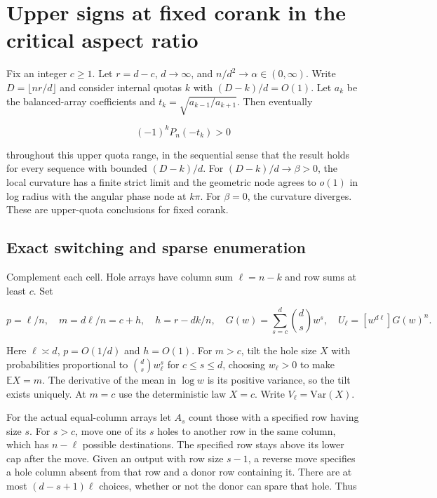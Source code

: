 \section{Upper signs at fixed corank in the critical aspect ratio}\label{sec:fixed-corank-critical-upper}

Fix an integer $c\ge1$. Let $r=d-c$, $d\to\infty$, and $n/d^2\to\alpha\in(0,\infty)$. Write $D=\lfloor nr/d\rfloor$ and consider internal quotas $k$ with $(D-k)/d=O(1)$. Let $a_k$ be the balanced-array coefficients and $t_k=\sqrt{a_{k-1}/a_{k+1}}$. Then eventually

\begin{equation*}
(-1)^kP_n(-t_k)>0
\end{equation*}

throughout this upper quota range, in the sequential sense that the result holds for every sequence with bounded $(D-k)/d$. For $(D-k)/d\to\beta>0$, the local curvature has a finite strict limit and the geometric node agrees to $o(1)$ in log radius with the angular phase node at $k\pi$. For $\beta=0$, the curvature diverges. These are upper-quota conclusions for fixed corank.

\subsection{Exact switching and sparse enumeration}

Complement each cell. Hole arrays have column sum $\ell=n-k$ and row sums at least $c$. Set

\begin{equation*}
p=\ell/n,\quad m=d\ell/n=c+h,\quad h=r-dk/n,\quad
G(w)=\sum_{s=c}^d\binom ds w^s,\quad U_\ell=[w^{d\ell}]G(w)^n .
\end{equation*}

Here $\ell\asymp d$, $p=O(1/d)$ and $h=O(1)$. For $m>c$, tilt the hole size $X$ with probabilities proportional to $\binom ds w_\ell^s$ for $c\le s\le d$, choosing $w_\ell>0$ to make $\mathbb E X=m$. The derivative of the mean in $\log w$ is its positive variance, so the tilt exists uniquely. At $m=c$ use the deterministic law $X=c$. Write $V_\ell=\mathrm{Var}(X)$.

For the actual equal-column arrays let $A_s$ count those with a specified row having size $s$. For $s>c$, move one of its $s$ holes to another row in the same column, which has $n-\ell$ possible destinations. The specified row stays above its lower cap after the move. Given an output with row size $s-1$, a reverse move specifies a hole column absent from that row and a donor row containing it. There are at most $(d-s+1)\ell$ choices, whether or not the donor can spare that hole. Thus

